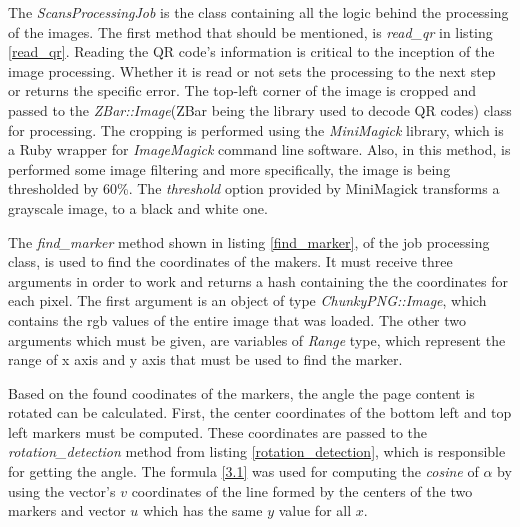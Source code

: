 

The \textit{ScansProcessingJob} is the class containing all the logic behind the processing of the images. The first method that should be mentioned, is \textit{read\_qr} in listing \ref{read_qr}. Reading the QR code's information is critical to the inception of the image processing. Whether it is read or not sets the processing to the next step or returns the specific error. The top-left corner of the image is cropped and passed to the \textit{ZBar::Image}(ZBar being the library used to decode QR codes) class for processing. The cropping is performed using the \textit{MiniMagick} library, which is a Ruby wrapper for \textit{ImageMagick} command line software. Also, in this method, is performed some image filtering and more specifically, the image is being thresholded by 60\%. The \textit{threshold} option provided by MiniMagick transforms a grayscale image, to a black and white one. 



The \textit{find\_marker} method shown in listing \ref{find_marker}, of the job processing class, is used to find the coordinates of the makers. It must receive three arguments in order to work and returns a hash containing the the coordinates for each pixel. The first argument is an object of type \textit{ChunkyPNG::Image}, which contains the rgb values of the entire image that was loaded. The other two arguments which must be given, are variables of \textit{Range} type, which represent the range of x axis and y axis that must be used to find the marker.  



Based on the found coodinates of the markers, the angle the page content is rotated can be calculated. First, the center coordinates of the bottom left and top left markers must be computed. These coordinates are passed to the \textit{rotation\_detection} method from listing \ref{rotation_detection}, which is responsible for getting the angle. The formula \ref{3.1} was used for computing the \textit{cosine} of $\alpha$ by using the vector's $v$ coordinates of the line formed by the centers of the two markers and vector $u$ which has the same $y$ value for all $x$.


